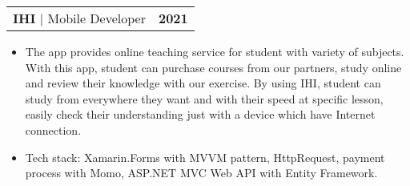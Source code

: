 \documentclass[letterpaper,11pt]{article}
\makeatletter
\newcommand{\resumeItem}[1]{
	\item\small{
		{#1 \vspace{-2pt}}
	}
}
\newcommand{\resumeProjectHeading}[2]{
	\item
	\begin{tabular*}{1.001\textwidth}{l@{\extracolsep{\fill}}r}
		\small#1 & \textbf{\small #2}\\
	\end{tabular*}\vspace{-7pt}
}
\newcommand{\resumeItemListStart}{\begin{itemize}}
\newcommand{\resumeItemListEnd}{\end{itemize}\vspace{-5pt}}
\makeatother
\begin{document}
\resumeProjectHeading
{\textbf{\large{IHI}} $|$ \large{Mobile Developer}}{2021}
\resumeItemListStart
\resumeItem{\normalsize{The app provides online teaching service for student with
		variety of subjects. With this app, student can purchase courses
		from our partners, study online and review their knowledge with
		our exercise. By using IHI, student can study from everywhere
		they want and with their speed at specific lesson, easily check
		their understanding just with a device which have Internet connection.}}
\resumeItem{\normalsize{Tech stack: Xamarin.Forms with MVVM pattern, HttpRequest, payment process
		with Momo, ASP.NET MVC Web API with Entity Framework.}}
\resumeItemListEnd
\vspace{-13pt}




\end{document}
